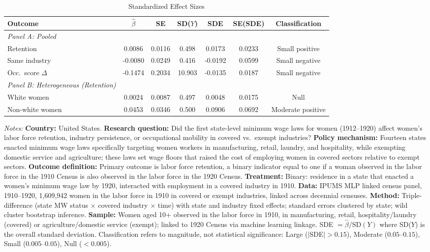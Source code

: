 \begin{table}[t]
\centering
\caption{Standardized Effect Sizes}
\label{tab:sde}
\begin{adjustbox}{max width=\textwidth}
\begin{tabular}{lcccccc}
\toprule
Outcome & $\hat{\beta}$ & SE & SD($Y$) & SDE & SE(SDE) & Classification \\
\midrule
\textit{Panel A: Pooled} \\[3pt]
Retention & 0.0086 & 0.0116 & 0.498 & 0.0173 & 0.0233 & Small positive \\
Same industry & -0.0080 & 0.0249 & 0.416 & -0.0192 & 0.0599 & Small negative \\
Occ.\ score $\Delta$ & -0.1474 & 0.2034 & 10.903 & -0.0135 & 0.0187 & Small negative \\
\midrule
\textit{Panel B: Heterogeneous (Retention)} \\[3pt]
White women & 0.0024 & 0.0087 & 0.497 & 0.0048 & 0.0175 & Null \\
Non-white women & 0.0453 & 0.0346 & 0.500 & 0.0906 & 0.0692 & Moderate positive \\
\bottomrule
\end{tabular}
\end{adjustbox}
\par\vspace{0.5em}
\parbox{\textwidth}{\footnotesize \textit{Notes:} \textbf{Country:} United States. \textbf{Research question:} Did the first state-level minimum wage laws for women (1912--1920) affect women's labor force retention, industry persistence, or occupational mobility in covered vs.\ exempt industries? \textbf{Policy mechanism:} Fourteen states enacted minimum wage laws specifically targeting women workers in manufacturing, retail, laundry, and hospitality, while exempting domestic service and agriculture; these laws set wage floors that raised the cost of employing women in covered sectors relative to exempt sectors. \textbf{Outcome definition:} Primary outcome is labor force retention, a binary indicator equal to one if a woman observed in the labor force in the 1910 Census is also observed in the labor force in the 1920 Census. \textbf{Treatment:} Binary: residence in a state that enacted a women's minimum wage law by 1920, interacted with employment in a covered industry in 1910. \textbf{Data:} IPUMS MLP linked census panel, 1910--1920, 1,609,942 women in the labor force in 1910 in covered or exempt industries, linked across decennial censuses. \textbf{Method:} Triple-difference (state MW status $\times$ covered industry $\times$ time) with state and industry fixed effects; standard errors clustered by state; wild cluster bootstrap inference. \textbf{Sample:} Women aged 10+ observed in the labor force in 1910, in manufacturing, retail, hospitality/laundry (covered) or agriculture/domestic service (exempt); linked to 1920 Census via machine learning linkage. SDE $= \hat{\beta} / \text{SD}(Y)$ where SD($Y$) is the overall standard deviation. Classification refers to magnitude, not statistical significance: Large ($|$SDE$| > 0.15$), Moderate ($0.05$--$0.15$), Small ($0.005$--$0.05$), Null ($< 0.005$).
}
\end{table}

